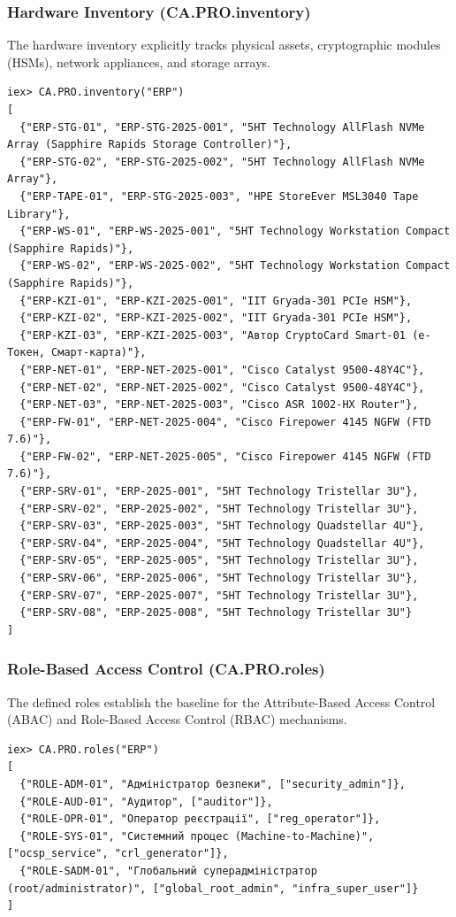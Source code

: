 \documentclass{article}
\begin{document}
\subsubsection{Hardware Inventory (CA.PRO.inventory)}
The hardware inventory explicitly tracks physical assets, cryptographic modules (HSMs), network appliances, and storage arrays.
{\scriptsize
{}
\begin{verbatim}
iex> CA.PRO.inventory("ERP")
[
  {"ERP-STG-01", "ERP-STG-2025-001", "5HT Technology AllFlash NVMe Array (Sapphire Rapids Storage Controller)"},
  {"ERP-STG-02", "ERP-STG-2025-002", "5HT Technology AllFlash NVMe Array"},
  {"ERP-TAPE-01", "ERP-STG-2025-003", "HPE StoreEver MSL3040 Tape Library"},
  {"ERP-WS-01", "ERP-WS-2025-001", "5HT Technology Workstation Compact (Sapphire Rapids)"},
  {"ERP-WS-02", "ERP-WS-2025-002", "5HT Technology Workstation Compact (Sapphire Rapids)"},
  {"ERP-KZI-01", "ERP-KZI-2025-001", "IIT Gryada-301 PCIe HSM"},
  {"ERP-KZI-02", "ERP-KZI-2025-002", "IIT Gryada-301 PCIe HSM"},
  {"ERP-KZI-03", "ERP-KZI-2025-003", "Автор CryptoCard Smart-01 (е-Токен, Смарт-карта)"},
  {"ERP-NET-01", "ERP-NET-2025-001", "Cisco Catalyst 9500-48Y4C"},
  {"ERP-NET-02", "ERP-NET-2025-002", "Cisco Catalyst 9500-48Y4C"},
  {"ERP-NET-03", "ERP-NET-2025-003", "Cisco ASR 1002-HX Router"},
  {"ERP-FW-01", "ERP-NET-2025-004", "Cisco Firepower 4145 NGFW (FTD 7.6)"},
  {"ERP-FW-02", "ERP-NET-2025-005", "Cisco Firepower 4145 NGFW (FTD 7.6)"},
  {"ERP-SRV-01", "ERP-2025-001", "5HT Technology Tristellar 3U"},
  {"ERP-SRV-02", "ERP-2025-002", "5HT Technology Tristellar 3U"},
  {"ERP-SRV-03", "ERP-2025-003", "5HT Technology Quadstellar 4U"},
  {"ERP-SRV-04", "ERP-2025-004", "5HT Technology Quadstellar 4U"},
  {"ERP-SRV-05", "ERP-2025-005", "5HT Technology Tristellar 3U"},
  {"ERP-SRV-06", "ERP-2025-006", "5HT Technology Tristellar 3U"},
  {"ERP-SRV-07", "ERP-2025-007", "5HT Technology Tristellar 3U"},
  {"ERP-SRV-08", "ERP-2025-008", "5HT Technology Tristellar 3U"}
]
\end{verbatim}
}

\subsubsection{Role-Based Access Control (CA.PRO.roles)}
The defined roles establish the baseline for the Attribute-Based Access Control (ABAC) and Role-Based Access Control (RBAC) mechanisms.
{\scriptsize
{}
\begin{verbatim}
iex> CA.PRO.roles("ERP")
[
  {"ROLE-ADM-01", "Адміністратор безпеки", ["security_admin"]},
  {"ROLE-AUD-01", "Аудитор", ["auditor"]},
  {"ROLE-OPR-01", "Оператор реєстрації", ["reg_operator"]},
  {"ROLE-SYS-01", "Системний процес (Machine-to-Machine)", ["ocsp_service", "crl_generator"]},
  {"ROLE-SADM-01", "Глобальний суперадміністратор (root/administrator)", ["global_root_admin", "infra_super_user"]}
]
\end{verbatim}
}
\end{document}
